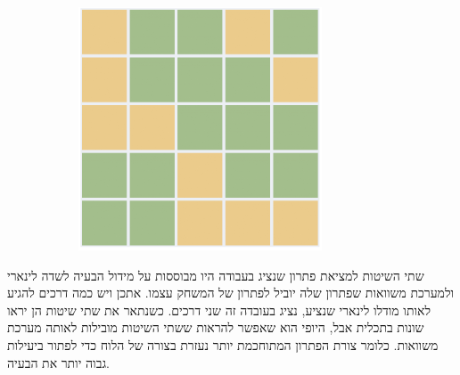 \documentclass[12pt,leqno]{article}
\theoremstyle{theoremdd}
\begin{document}
\begin{figure}[ht]
\begin{subfigure}[b]{.25\linewidth}
    \end{subfigure}
    \begin{subfigure}[b]{.25\linewidth}
    \includegraphics[width=0.95\linewidth]{images/5x5_sol.PNG}
    \end{subfigure}
\end{figure}

שתי השיטות למציאת פתרון שנציג בעבודה היו מבוססות
על מידול הבעיה לשדה לינארי ולמערכת משוואות שפתרון שלה יוביל לפתרון של המשחק עצמו.
אתכן ויש כמה דרכים להגיע לאותו מודלו לינארי שנציע, נציג בעובדה זה שני דרכים.
כשנתאר את שתי שיטות הן יראו שונות בתכלית אבל,
היופי הוא שאפשר להראות ששתי השיטות מובילות לאותה מערכת משוואות.
כלומר צורת הפתרון המתוחכמת יותר נעזרת בצורה של הלוח כדי לפתור ביעילות גבוה יותר את הבעיה.
\end{document}
